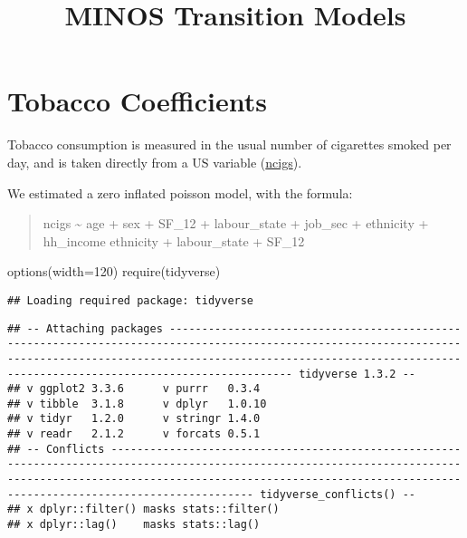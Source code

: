 \documentclass[
]{article}
\title{MINOS Transition Models}
\author{}
\date{\vspace{-2.5em}}
\newenvironment{Shaded}{\begin{snugshade}}{\end{snugshade}}
\newcommand{\AttributeTok}[1]{\textcolor[rgb]{0.77,0.63,0.00}{#1}}
\newcommand{\DecValTok}[1]{\textcolor[rgb]{0.00,0.00,0.81}{#1}}
\newcommand{\FunctionTok}[1]{\textcolor[rgb]{0.00,0.00,0.00}{#1}}
\newcommand{\NormalTok}[1]{#1}
\begin{document}
\maketitle

\hypertarget{tobacco-coefficients}{%
\section{Tobacco Coefficients}\label{tobacco-coefficients}}

Tobacco consumption is measured in the usual number of cigarettes smoked
per day, and is taken directly from a US variable
(\href{https://www.understandingsociety.ac.uk/documentation/mainstage/dataset-documentation/variable/ncigs}{ncigs}).

We estimated a zero inflated poisson model, with the formula:

\begin{quote}
ncigs \textasciitilde{} age + sex + SF\_12 + labour\_state + job\_sec +
ethnicity + hh\_income \textbar{} ethnicity + labour\_state + SF\_12
\end{quote}

\begin{Shaded}
\begin{Highlighting}[]
\FunctionTok{options}\NormalTok{(}\AttributeTok{width=}\DecValTok{120}\NormalTok{)}
\FunctionTok{require}\NormalTok{(tidyverse)}
\end{Highlighting}
\end{Shaded}

\begin{verbatim}
## Loading required package: tidyverse
\end{verbatim}

\begin{verbatim}
## -- Attaching packages ------------------------------------------------------------------------------------------------------------------------------------------------------------------------------------------------------------------------------------- tidyverse 1.3.2 --
## v ggplot2 3.3.6      v purrr   0.3.4 
## v tibble  3.1.8      v dplyr   1.0.10
## v tidyr   1.2.0      v stringr 1.4.0 
## v readr   2.1.2      v forcats 0.5.1 
## -- Conflicts ---------------------------------------------------------------------------------------------------------------------------------------------------------------------------------------------------------------------------------------- tidyverse_conflicts() --
## x dplyr::filter() masks stats::filter()
## x dplyr::lag()    masks stats::lag()
\end{verbatim}
\end{document}
